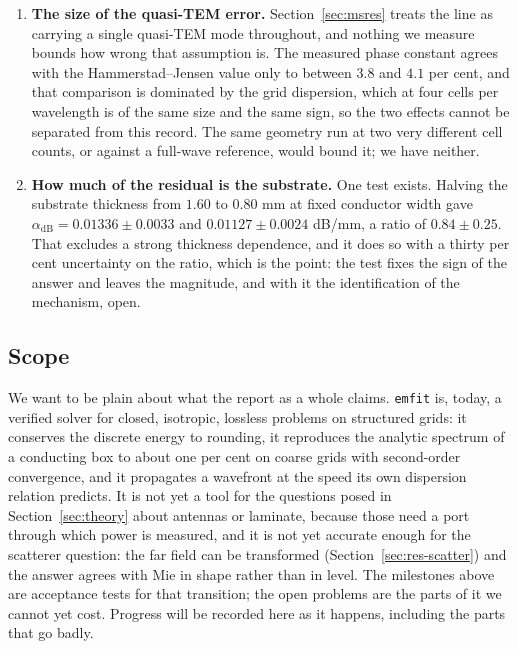 \begin{enumerate}[leftmargin=1.6em,itemsep=3pt]
  \item \textbf{The size of the quasi-TEM error.} Section~\ref{sec:msres} treats the line as carrying a single
        quasi-TEM mode throughout, and nothing we measure bounds how wrong that assumption is. The measured phase
        constant agrees with the Hammerstad--Jensen value only to between $3.8$ and $4.1$ per cent, and that
        comparison is dominated by the grid dispersion, which at four cells per wavelength is of the same size and
        the same sign, so the two effects cannot be separated from this record. The same geometry run at two very
        different cell counts, or against a full-wave reference, would bound it; we have neither.
  \item \textbf{How much of the residual is the substrate.} One test exists. Halving the substrate thickness from
        $1.60$ to $0.80$ mm at fixed conductor width gave $\alpha_{\mathrm{dB}} = 0.01336 \pm 0.0033$ and
        $0.01127 \pm 0.0024$ dB/mm, a ratio of $0.84 \pm 0.25$. That excludes a strong thickness dependence, and
        it does so with a thirty per cent uncertainty on the ratio, which is the point: the test fixes the sign of
        the answer and leaves the magnitude, and with it the identification of the mechanism, open.
\end{enumerate}

\subsection{Scope}

We want to be plain about what the report as a whole claims. \texttt{emfit} is, today, a verified solver for
closed, isotropic, lossless problems on structured grids: it conserves the discrete energy to rounding, it
reproduces the analytic spectrum of a conducting box to about one per cent on coarse grids with second-order
convergence, and it propagates a wavefront at the speed its own dispersion relation predicts. It is not yet a tool
for the questions posed in Section~\ref{sec:theory} about antennas or laminate, because those need a port through
which power is measured, and it is not yet accurate enough for the scatterer question: the far field can be
transformed (Section~\ref{sec:res-scatter}) and the answer agrees with Mie in shape rather than in level. The
milestones above are acceptance tests for that transition; the open problems are the parts of it we cannot yet
cost. Progress will be recorded here as it happens, including the parts that go badly.
